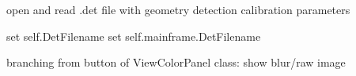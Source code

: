 \documentclass[letterpaper,10pt,english]{sphinxmanual}
\begin{document}
\begin{fulllineitems}
\begin{fulllineitems}
\label{\detokenize{PeakSearchGUI:LaueTools.GUI.PeakSearchGUI.ViewColorPanel.onOpenDetFile}}
open and read .det file with geometry detection calibration parameters

set self.DetFilename
set self.mainframe.DetFilename

\end{fulllineitems}


\begin{fulllineitems}
\label{\detokenize{PeakSearchGUI:LaueTools.GUI.PeakSearchGUI.ViewColorPanel.showImage}}
branching from button of ViewColorPanel class: show blur/raw image

\end{fulllineitems}


\end{fulllineitems}

\end{document}
